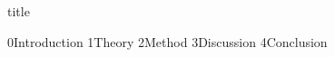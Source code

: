 \documentclass{article}
\begin{document}
{title}

\vspace*{\fill}
\begin{abstract}
    \begin{quotation}
        \noindent    
        {Abstract}
    \end{quotation}
\end{abstract}
\vspace*{\fill}


\newpage

\frontmatter

\tableofcontents

\listoffigures
\listoftables

\mainmatter

{0Introduction}
{1Theory}
{2Method}
{3Discussion}
{4Conclusion}



\newpage
\printbibliography[heading = bibintoc, title = Bibliography]    %

\addappendix


%

\end{document}
